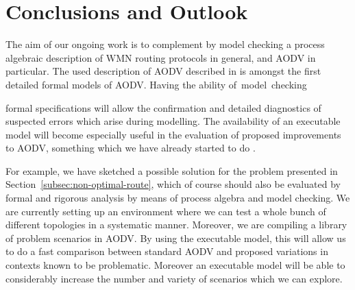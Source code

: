 \documentclass[conference,twoside]{IEEEtran}
\begin{document}
\vspace{1.4pt}
\section{Conclusions and Outlook}\label{sec:conclude}
\vspace{1.4pt}

The aim of our ongoing work is to complement by model checking
a process algebraic description of WMN routing protocols in general, and AODV in particular.
The used description of AODV described in \cite{TR11} is amongst the
first detailed formal models of AODV.
Having the ability of~model~checking
\newpage

formal specifications will allow the confirmation and detailed
diagnostics of suspected errors which arise during modelling.
The availability of an executable model will become especially useful
in the evaluation of proposed improvements to AODV,  something which
we have already started to do \cite{TR11}.

For example, we have sketched a possible solution for the problem
presented in Section~\ref{subsec:non-optimal-route}, which of course
should also be evaluated by formal and rigorous analysis by means of
process algebra and model checking.
We are currently setting up an environment where we can
test a whole bunch of different topologies in a systematic manner. Moreover, we are compiling a library of problem scenarios in AODV. By using the executable model, this will allow us to do a fast comparison between standard AODV and proposed variations in contexts  known to be problematic.
Moreover an executable model will be able to considerably increase the number and variety of scenarios which we can explore.
\end{document}
